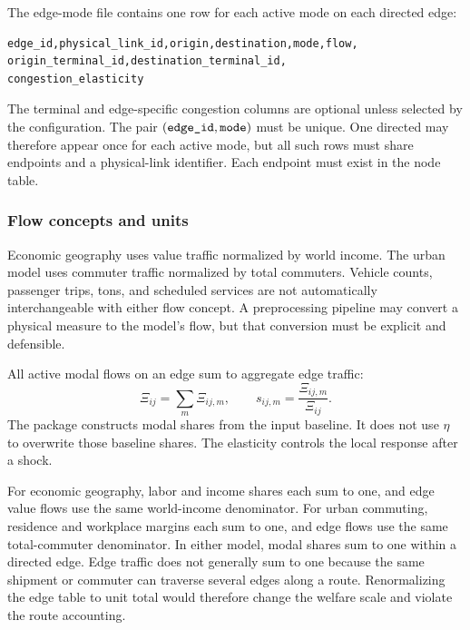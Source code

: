 The edge-mode file contains one row for each active mode on each directed edge:
\begin{lstlisting}
edge_id,physical_link_id,origin,destination,mode,flow,
origin_terminal_id,destination_terminal_id,
congestion_elasticity
\end{lstlisting}
The terminal and edge-specific congestion columns are optional unless selected
by the configuration. The pair \((\texttt{edge\_id},\texttt{mode})\) must be
unique. One directed  may therefore appear once for each active
mode, but all such rows must share endpoints and a physical-link identifier.
Each endpoint must exist in the node table.


\subsubsection{Flow concepts and units}

Economic geography uses value traffic normalized by world income. The urban
model uses commuter traffic normalized by total commuters. Vehicle counts,
passenger trips, tons, and scheduled services are not automatically
interchangeable with either flow concept. A preprocessing pipeline may convert
a physical measure to the model's flow, but that conversion must be explicit
and defensible.

All active modal flows on an edge sum to aggregate edge traffic:
\[
 \Xi_{ij}=\sum_m\Xi_{ij,m},
 \qquad
 s_{ij,m}=\frac{\Xi_{ij,m}}{\Xi_{ij}}.
\]
The package constructs modal shares from the input baseline. It does not use
\(\eta\) to overwrite those baseline shares. The elasticity controls the local
response after a shock.

For economic geography, labor and income shares each sum to one, and edge value
flows use the same world-income denominator. For urban commuting, residence and
workplace margins each sum to one, and edge flows use the same total-commuter
denominator. In either model, modal shares sum to one within a directed edge.
Edge traffic does not generally sum to one because the same shipment or
commuter can traverse several edges along a route.
Renormalizing the edge table to unit total would therefore change the welfare
scale and violate the route accounting.

